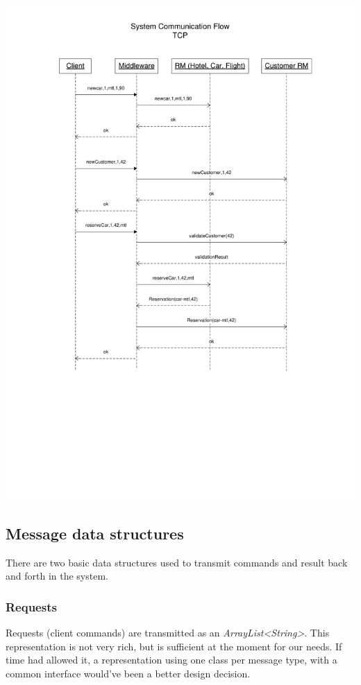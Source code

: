 \documentclass[11pt]{article}
\begin{document}
\begin{center}
  \includegraphics[scale=0.75]{dataflow-tcp.pdf}
\end{center}



\subsection{Message data structures}

There are two basic data structures used to transmit commands and
result back and forth in the system.

\subsubsection{Requests}

Requests (client commands) are transmitted as an {\it
  ArrayList<String>}.  This representation is not very rich, but is
sufficient at the moment for our needs.  If time had allowed it, a
representation using one class per message type, with a common
interface would've been a better design decision.
\end{document}
